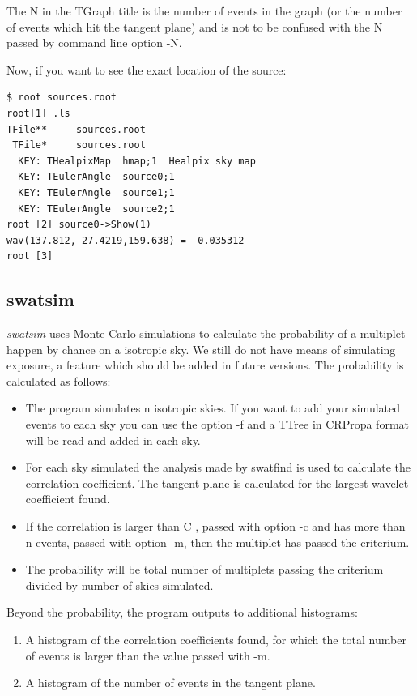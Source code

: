 \documentclass[12pt]{article}
\begin{document}
The N in the TGraph title is the number of events in the graph (or the number of 
events which hit the tangent plane) and is not to be confused with the N passed by command line
option -N.

Now, if you want to see the exact location of the source:
{\bf \color{brown}
\begin{lstlisting}
$ root sources.root
root[1] .ls
TFile**		sources.root	
 TFile*		sources.root	
  KEY: THealpixMap	hmap;1	Healpix sky map
  KEY: TEulerAngle	source0;1	
  KEY: TEulerAngle	source1;1	
  KEY: TEulerAngle	source2;1	
root [2] source0->Show(1)
wav(137.812,-27.4219,159.638) = -0.035312
root [3] 
\end{lstlisting}
}
\subsection{swatsim}
{\it swatsim} uses Monte Carlo simulations to calculate the probability of a multiplet happen by 
chance on a isotropic sky. We still do not have means of simulating exposure, a feature which should be 
added in future versions. The probability is calculated as follows: 
\begin{itemize}
\item The program simulates n isotropic skies. If you want to add your simulated events
to each sky you can use the option -f and a TTree in CRPropa format will be read
and added in each sky.
\item For each sky simulated the analysis made by swatfind is used to calculate the
correlation coefficient. The tangent plane is calculated for the largest wavelet coefficient found.
\item If the correlation is larger than C , passed with option -c and has more than n events, passed 
with option -m, then the multiplet has passed the criterium.
\item The probability will be total number of multiplets passing the criterium divided by 
number of skies simulated.
\end{itemize}

Beyond the probability, the program outputs to additional histograms:
\begin{enumerate}
\item A histogram of the correlation coefficients found, for which the total number
of events is larger than the value passed with -m.
\item A histogram of the number of events in the tangent plane.
\end{enumerate}
\end{document}
